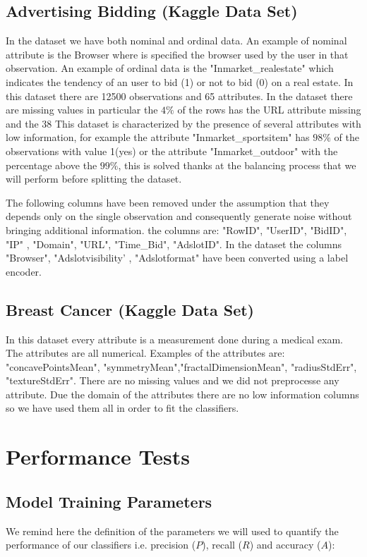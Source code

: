 \documentclass{article}
\begin{document}
\subsection{Advertising Bidding (Kaggle Data Set)}
In the dataset we have both nominal and ordinal data.
An example of nominal attribute is the Browser where is specified the browser used by the user in that observation.
An example of ordinal data is the "Inmarket\_realestate" which indicates the tendency of an user to bid (1) or not to bid (0) on a real estate. In this dataset there are 12500 observations and 65 attributes.
In the dataset there are missing values in particular the $4\%$ of the rows has the URL attribute missing and the 38%
This dataset is characterized by the presence of several attributes with low information, for example the attribute "Inmarket\_sportsitem" has $98\%$ of the observations with value 1(yes)  or the attribute "Inmarket\_outdoor" with the percentage above the $99\%$, this is solved thanks at the balancing process that we will perform before splitting the dataset.

The following columns have been removed under the assumption that they depends only on the single observation and consequently generate noise without bringing additional information.
the columns are: "RowID", "UserID", "BidID", "IP" , "Domain", "URL", "Time\_Bid", "AdslotID".
In the dataset the columns "Browser", "Adslotvisibility' , "Adslotformat" have been converted using a label encoder.


\subsection{Breast Cancer (Kaggle Data Set)}
In this dataset every attribute is a measurement done during a medical exam.
The attributes are all numerical.
Examples of the attributes are: "concavePointsMean", "symmetryMean","fractalDimensionMean", "radiusStdErr", "textureStdErr".
There are no missing values and we did not preprocesse any attribute. Due the domain of the attributes there are no low information columns so we have used them all in order to fit the classifiers.



\section{Performance Tests}
\subsection{Model Training Parameters}
We remind here the definition of the parameters we will used to quantify the performance of our classifiers i.e. precision ($P$), recall ($R$) and accuracy ($A$):
\\
\end{document}
